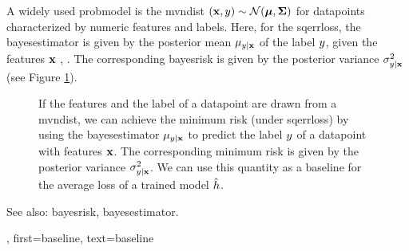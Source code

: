 {{A widely used \gls{probmodel} is the \gls{mvndist} $\left( {\bf x},y \right) \sim \mathcal{N}({\bm \mu},{\bm \Sigma})$ 
for \glspl{datapoint} characterized by numeric \glspl{feature} and \glspl{label}.
Here, for the \gls{sqerrloss}, the \gls{bayesestimator} is given by the posterior 
\gls{mean} $\mu_{y|{\bf x}}$ of the \gls{label} $y$, given the 
\glspl{feature} ${\bf x}$ \cite{LC}, \cite{GrayProbBook}. The corresponding \gls{bayesrisk} 
is given by the posterior \gls{variance} 
$\sigma^{2}_{y|{\bf x}}$ (see Figure \ref{fig_post_baseline_dict}).
	\begin{figure}[H]
		\begin{center}
		\end{center}
		\caption{If the \glspl{feature} and the \gls{label} of a \gls{datapoint} are drawn from a \gls{mvndist}, we 
		can achieve the \gls{minimum} \gls{risk} (under \gls{sqerrloss}) by using the \gls{bayesestimator} $\mu_{y|{\bf x}}$ 
		to predict the \gls{label} $y$ of a \gls{datapoint} with \glspl{feature} ${\bf x}$. The corresponding 
		\gls{minimum} \gls{risk} is given by the posterior \gls{variance} $\sigma^{2}_{y|{\bf x}}$. We can use 
		this quantity as a baseline for the average \gls{loss} of a trained \gls{model} $\hat{h}$. 
		\label{fig_post_baseline_dict}}
	\end{figure}
		See also: \gls{bayesrisk}, \gls{bayesestimator}.},
    first={baseline},
    text={baseline}
}

